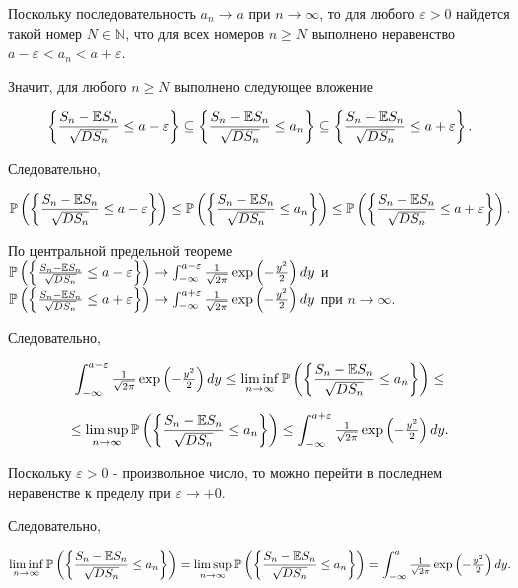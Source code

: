 Поскольку последовательность $a_{n} \to a$ при $n\to \infty $, то для любого $\varepsilon >0$ найдется такой номер $N\in {\mathbb N}$, что для всех номеров $n\ge N$ выполнено неравенство $a-\varepsilon <a_{n} <a+\varepsilon $.

Значит, для любого $n\ge N$ выполнено следующее вложение

\[\left\{\frac{S_{n} -{\rm {\mathbb E}}S_{n} }{\sqrt{DS_{n} } } \le a-\varepsilon \right\}\subseteq \left\{\frac{S_{n} -{\rm {\mathbb E}}S_{n} }{\sqrt{DS_{n} } } \le a_{n} \right\}\subseteq \left\{\frac{S_{n} -{\rm {\mathbb E}}S_{n} }{\sqrt{DS_{n} } } \le a+\varepsilon \right\}.\] 

Следовательно,

\[{\rm {\mathbb P}}\left(\left\{\frac{S_{n} -{\rm {\mathbb E}}S_{n} }{\sqrt{DS_{n} } } \le a-\varepsilon \right\}\right)\le {\rm {\mathbb P}}\left(\left\{\frac{S_{n} -{\rm {\mathbb E}}S_{n} }{\sqrt{DS_{n} } } \le a_{n} \right\}\right)\le {\rm {\mathbb P}}\left(\left\{\frac{S_{n} -{\rm {\mathbb E}}S_{n} }{\sqrt{DS_{n} } } \le a+\varepsilon \right\}\right).\] 

По центральной предельной теореме ${\rm {\mathbb P}}\left(\left\{\frac{S_{n} -{\rm {\mathbb E}}S_{n} }{\sqrt{DS_{n} } } \le a-\varepsilon \right\}\right)\to \int _{-\infty }^{a-\varepsilon }{\tfrac{1}{\sqrt{2\pi } }} \exp \left(-{\tfrac{y^{2} }{2}} \right)dy $ и ${\rm {\mathbb P}}\left(\left\{\frac{S_{n} -{\rm {\mathbb E}}S_{n} }{\sqrt{DS_{n} } } \le a+\varepsilon \right\}\right)\to \int _{-\infty }^{a+\varepsilon }{\tfrac{1}{\sqrt{2\pi } }} \exp \left(-{\tfrac{y^{2} }{2}} \right)dy $ при $n\to \infty $.

Следовательно,

\[\int _{-\infty }^{a-\varepsilon }{\tfrac{1}{\sqrt{2\pi } }} \exp \left(-{\tfrac{y^{2} }{2}} \right)dy \le \mathop{\lim \inf }\limits_{n\to \infty } {\rm {\mathbb P}}\left(\left\{\frac{S_{n} -{\rm {\mathbb E}}S_{n} }{\sqrt{DS_{n} } } \le a_{n} \right\}\right)\le \] 

\[\le \mathop{\lim \sup }\limits_{n\to \infty } {\rm {\mathbb P}}\left(\left\{\frac{S_{n} -{\rm {\mathbb E}}S_{n} }{\sqrt{DS_{n} } } \le a_{n} \right\}\right)\le \int _{-\infty }^{a+\varepsilon }{\tfrac{1}{\sqrt{2\pi } }} \exp \left(-{\tfrac{y^{2} }{2}} \right)dy .\] 

Поскольку $\varepsilon >0$ - произвольное число, то можно перейти в последнем неравенстве к пределу при $\varepsilon \to +0$.

Следовательно,

\[\mathop{\lim \inf }\limits_{n\to \infty } {\rm {\mathbb P}}\left(\left\{\frac{S_{n} -{\rm {\mathbb E}}S_{n} }{\sqrt{DS_{n} } } \le a_{n} \right\}\right)=\mathop{\lim \sup }\limits_{n\to \infty } {\rm {\mathbb P}}\left(\left\{\frac{S_{n} -{\rm {\mathbb E}}S_{n} }{\sqrt{DS_{n} } } \le a_{n} \right\}\right)=\int _{-\infty }^{a}{\tfrac{1}{\sqrt{2\pi } }} \exp \left(-{\tfrac{y^{2} }{2}} \right)dy .\] 

